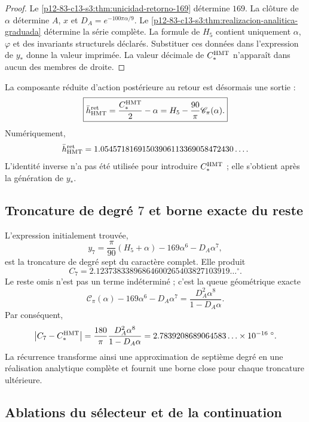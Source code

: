\begin{proof}
Le \cref{p12-83-c13-s3:thm:unicidad-retorno-169} détermine \(169\). La clôture de
\(\alpha\) détermine \(A\), \(x\) et
\(D_A=e^{-100\pi\alpha/9}\). Le \cref{p12-83-c13-s3:thm:realizacion-analitica-graduada}
détermine la série complète. La formule de \(H_5\) contient uniquement
\(\alpha\), \(\varphi\) et des invariants structurels déclarés. Substituer
ces données dans l'expression de \(y_*\) donne la valeur imprimée. La valeur décimale
de \(C_*^{\rm HMT}\) n'apparaît dans aucun des membres de droite.
\end{proof}

La composante réduite d'action postérieure au retour est désormais une
sortie :
\[
\boxed{
\bar h_{\rm HMT}^{\rm ret}
=\frac{C_*^{\rm HMT}}2-\alpha
=H_5-\frac{90}{\pi}\mathscr C_\pi(\alpha).}
\]
Numériquement,
\[
\bar h_{\rm HMT}^{\rm ret}
=1.05457181691503906113369058472430\ldots.
\]
L'identité inverse n'a pas été utilisée pour introduire \(C_*^{\rm HMT}\) ; elle
s'obtient après la génération de \(y_*\).

\subsection{Troncature de degré \(7\) et borne exacte du reste}

L'expression initialement trouvée,
\[
y_7=\frac\pi{90}(H_5+\alpha)-169\alpha^6-D_A\alpha^7,
\]
est la troncature de degré sept du caractère complet. Elle produit
\[
C_7=2.12373833896864600265403827103919\ldots{}^\circ.
\]
Le reste omis n'est pas un terme indéterminé ; c'est la queue géométrique
exacte
\[
\mathscr C_\pi(\alpha)
-169\alpha^6-D_A\alpha^7
=\frac{D_A^2\alpha^8}{1-D_A\alpha}.
\]
Par conséquent,
\[
\left|C_7-C_*^{\rm HMT}\right|
=\frac{180}{\pi}\frac{D_A^2\alpha^8}{1-D_A\alpha}
=2.7839208689064583\ldots\times10^{-16}\;{}^\circ.
\]
La récurrence transforme ainsi une approximation de septième degré en une
réalisation analytique complète et fournit une borne close pour chaque
troncature ultérieure.

\subsection{Ablations du sélecteur et de la continuation}

